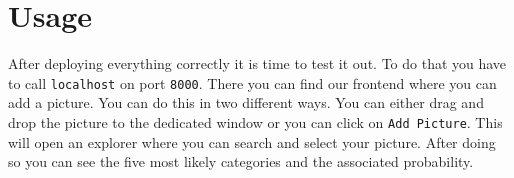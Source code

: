 \section{Usage}
After deploying everything correctly it is time to test it out. To do that you have to call \texttt{localhost} on port \texttt{8000}. There you can find our frontend where you can add a picture. You can do this in two different ways. You can either drag and drop the picture to the dedicated window or you can click on \texttt{Add Picture}. This will open an explorer where you can search and select your picture. After doing so you can see the five most likely categories and the associated probability.
